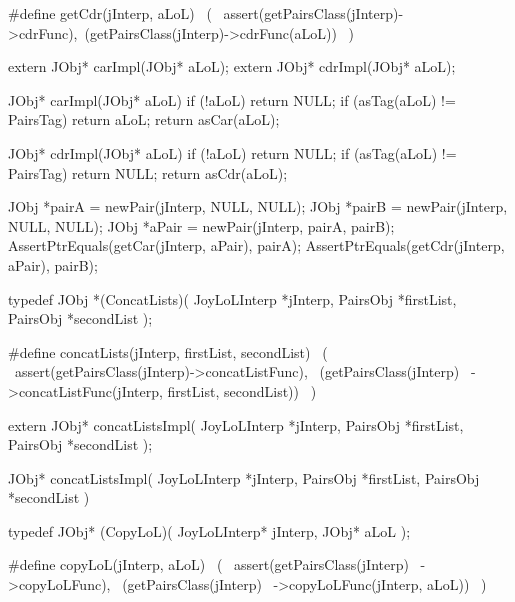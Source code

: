 #define getCdr(jInterp, aLoL)               \
  (                                         \
    assert(getPairsClass(jInterp)->cdrFunc),\
    (getPairsClass(jInterp)->cdrFunc(aLoL)) \
  )
\stopCHeader

\startCHeader
extern JObj* carImpl(JObj* aLoL);
extern JObj* cdrImpl(JObj* aLoL);
\stopCHeader
{}

\startCCode
JObj* carImpl(JObj* aLoL) {
  if (!aLoL) return NULL;
  if (asTag(aLoL) != PairsTag) return aLoL;
  return asCar(aLoL);
}

JObj* cdrImpl(JObj* aLoL) {
  if (!aLoL) return NULL;
  if (asTag(aLoL) != PairsTag) return NULL;
  return asCdr(aLoL);
}
\stopCCode


\startCTest
  JObj *pairA = newPair(jInterp, NULL, NULL);
  JObj *pairB = newPair(jInterp, NULL, NULL);
  JObj *aPair = newPair(jInterp, pairA, pairB);
  AssertPtrEquals(getCar(jInterp, aPair), pairA);
  AssertPtrEquals(getCdr(jInterp, aPair), pairB);
\stopCTest
\stopTestCase
\stopTestSuite

\startTestSuite[concatLists]
\startCHeader
typedef JObj *(ConcatLists)(
  JoyLoLInterp *jInterp,
  PairsObj     *firstList,
  PairsObj     *secondList
);

#define concatLists(jInterp, firstList, secondList)     \
  (                                                     \
    assert(getPairsClass(jInterp)->concatListFunc),     \
    (getPairsClass(jInterp)                             \
      ->concatListFunc(jInterp, firstList, secondList)) \
  )
\stopCHeader

\startCHeader
extern JObj* concatListsImpl(
  JoyLoLInterp *jInterp,
  PairsObj     *firstList,
  PairsObj     *secondList
);
\stopCHeader
{}

\startCCode
JObj* concatListsImpl(
  JoyLoLInterp *jInterp,
  PairsObj     *firstList,
  PairsObj     *secondList
) {
  
}

\stopCCode

\stopTestSuite

\startTestSuite[copyLoL]

\startCHeader
typedef JObj* (CopyLoL)(
  JoyLoLInterp* jInterp,
  JObj* aLoL
);

#define copyLoL(jInterp, aLoL)      \
  (                                 \
    assert(getPairsClass(jInterp)   \
      ->copyLoLFunc),               \
    (getPairsClass(jInterp)         \
      ->copyLoLFunc(jInterp, aLoL)) \
  )
\stopCHeader

